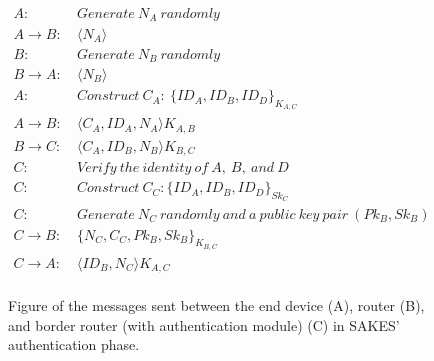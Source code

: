 \begin{figure}[h]
\begin{tcolorbox}[title=Authentication in SAKES]
\begin{align*}
A:\ & Generate\ N_A\ randomly\\
A \rightarrow B:\ & \langle{N_A}\rangle{}\\
B:\ & Generate\ N_B\ randomly\\
B \rightarrow A:\ & \langle{N_B}\rangle{}\\
A:\ & Construct\ C_{A}:\ \{ID_A, ID_B, ID_D\}_{K_{A,C}}\\
A \rightarrow B:\ & \langle{C_A, ID_A, N_A}\rangle{K_{A,B}}\\
B \rightarrow C:\ & \langle{C_A, ID_B, N_B}\rangle{K_{B,C}}\\
C:\ & Verify\ the\ identity\ of\ A,\ B,\ and\ D\\
C: \ & Construct\ C_C: \{ID_A, ID_B, ID_D\}_{Sk_{C}}\\
C:\ & Generate\ N_C\ randomly\ and\ a\ public\ key\ pair\ (Pk_B, Sk_B)\\
C \rightarrow B:\ & \{N_C, C_C, Pk_B, Sk_B\}_{K_{B,C}}\\
C \rightarrow A:\ & \langle{ID_B, N_C}\rangle{K_{A,C}}\\
\end{align*}
\end{tcolorbox}
\caption{Figure of the messages sent between the end device (A), router (B), and border router (with authentication module) (C) in SAKES' authentication phase.}
\label{fig:sakes-auth}
\end{figure}


